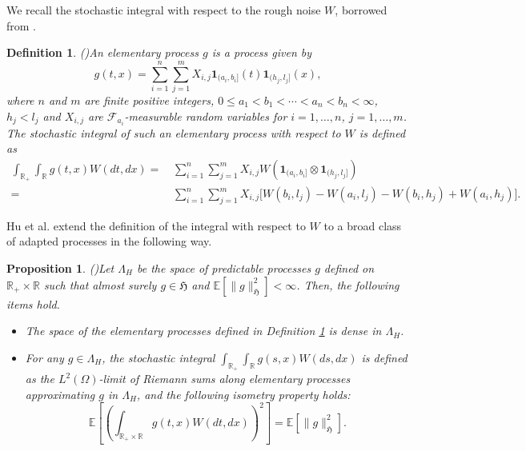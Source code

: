 \documentclass[11pt,reqno]{amsart}
\numberwithin{equation}{section}
\newtheorem{proposition}[theorem]{Proposition}
\newtheorem{definition}[theorem]{Definition}
\newcommand{\1}{{\bf 1}}
\newcommand{\2}{{\bf 2}}
\begin{document}
We recall the stochastic integral  with respect to the rough noise $W$, borrowed from \cite{HHLNT2017}.
\begin{definition}(\cite[Definition 2.2]{HHLNT2017})\label{def StoIt}
An elementary process $g$ is a process given by
$$
    g(t,x)=\sum_{i=1}^{n}\sum_{j=1}^{m} X_{i,j}\textbf{1}_{(a_i,b_i]}(t)\textbf{1}_{(h_j,l_j]}(x),
$$
   where $n$ and $m$ are finite positive integers, $0\leq a_1<b_1<\cdots<a_n<b_n<\infty$, $h_j<l_j$ and $X_{i,j}$ are $\mathcal{F}_{a_i}$-measurable random variables for $i=1,\dots,n$, $j=1,\dots,m$. The stochastic integral of such  an elementary  process with respect to $W$ is defined as
   \begin{equation}\label{SI_Ele}
     \begin{split}
       \int_{\mathbb{R}_{+}}\int_{\mathbb{R}} g(t,x)W(dt,dx) 
     =&\, \sum_{i=1}^{n}\sum_{j=1}^{m}  X_{i,j}W(\textbf{1}_{(a_i,b_i]}\otimes \textbf{1}_{(h_j,l_j]}) \\
      =&\, \sum_{i=1}^{n}\sum_{j=1}^{m}  X_{i,j}\Big[W(b_i,l_j)-W(a_i,l_j)-W(b_i,h_j)+W(a_i,h_j)\Big].
     \end{split}
   \end{equation}
 \end{definition}


Hu et al. \cite[Proposition 2.3]{HHLNT2017} extend the definition of the integral with respect to $W$ to a broad class of adapted processes in the following way.
\begin{proposition}(\cite[Proposition 2.3]{HHLNT2017})\label{prop 2.3}
   Let $\Lambda_{H}$ be the space of predictable processes $g$ defined on $\mathbb{R}_{+}\times\mathbb{R}$ such that almost surely $g\in\mathfrak{H}$ and $\mathbb{E}[\|g\|_{\mathfrak{H}}^2]<\infty$.  Then,  the following items hold.
   \begin{itemize}
       \item[(i).]
  The space of the elementary processes
    defined in Definition \ref{def StoIt} is dense in $\Lambda_{H}$.
      \item[(ii).]
 For any  $g\in\Lambda_{H}$, the stochastic integral $\int_{\mathbb{R}_{+}}\int_{\mathbb{R}} g(s,x)W(ds,dx)$ is defined  as the $L^2(\Omega)$-limit of  Riemann sums along elementary processes approximating $g$
in $\Lambda_H$, and the following isometry property holds:
   \begin{equation}\label{eq iso}
\mathbb{E}\left[\left(\int_{\mathbb{R}_+\times\mathbb{R}}g(t,x)W(dt,dx)\right)^2\right]=\mathbb{E}\left[\|g\|^2_{\mathfrak{H}}\right].
\end{equation}
\end{itemize}
\end{proposition}
\end{document}
